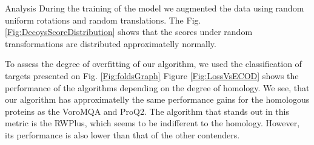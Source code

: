 \documentclass[final, unknownkeysallowed]{beamer}
\begin{document}
\begin{frame}{}
\begin{textblock}{39.0}
\begin{block}{Analysis}
During the training of the model we augmented the data using random uniform rotations and random translations. 
The Fig. \ref{Fig:DecoysScoreDistribution} shows that the scores under random transformations are distributed approximatelly normally.

To assess the degree of overfitting of our algorithm, we used the classification of targets presented on Fig. \ref{Fig:foldsGraph}
Figure \ref{Fig:LossVsECOD} shows the performance of the algorithms depending on the degree of homology. 
We see, that our algorithm has approximatelly the same performance gains for the homologous proteins as the VoroMQA and ProQ2. 
The algorithm that stands out in this metric is the RWPlus, which seems to be indifferent to the homology. 
However, its performance is also lower than that of the other contenders.


\end{block}
\end{textblock}
\end{frame}
\end{document}
